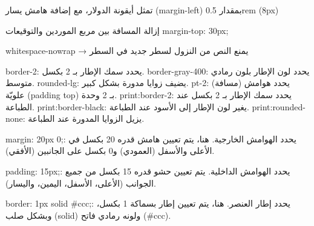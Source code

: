     تمثل أيقونة الدولار، مع إضافة هامش يسار (margin-left) بمقدار 0.5rem (8px)











    إزالة المسافة بين مربع الموردين والتوقيعات margin-top: 30px;

    whitespace-nowrap → يمنع النص من النزول لسطر جديد في السطر

    border-2: يحدد سمك الإطار بـ 2 بكسل.
    border-gray-400: يحدد لون الإطار بلون رمادي متوسط.
    rounded-lg: يضيف زوايا مدورة بشكل كبير.
    pt-2: يحدد هوامش (مسافة) علويّة (padding top) بـ 2 وحدة.
    print:border-2: يحدد سمك الإطار بـ 2 بكسل عند الطباعة.
    print:border-black: يغير لون الإطار إلى الأسود عند الطباعة.
    print:rounded-none: يزيل الزوايا المدورة عند الطباعة.


    margin: 20px 0;:
    يحدد الهوامش الخارجية. هنا، يتم تعيين هامش قدره 20 بكسل في الأعلى والأسفل (العمودي) و0 بكسل على الجانبين (الأفقي).

    padding: 15px;:
    يحدد الهوامش الداخلية. يتم تعيين حشو قدره 15 بكسل من جميع الجوانب (الأعلى، الأسفل، اليمين، واليسار).

    border: 1px solid #ccc;:
    يحدد إطار العنصر. هنا، يتم تعيين إطار بسماكة 1 بكسل، وبشكل صلب (solid) ولونه رمادي فاتح (#ccc).
